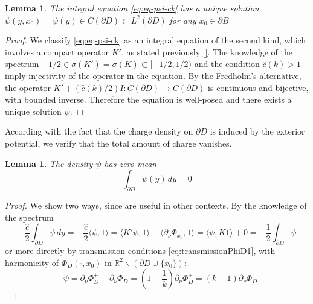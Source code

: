 \documentclass[10pt, a4paper, twoside, openright]{book}
\theoremstyle{definition}
\theoremstyle{plain}
\theoremstyle{plain}
\theoremstyle{plain}
\theoremstyle{plain}
\theoremstyle{plain}
\newtheorem{lemma}[subsection]{Lemma}
\theoremstyle{plain}
\theoremstyle{plain}
\theoremstyle{plain}
\begin{document}
\begin{lemma}
 The integral equation \ref{eq:eq-psi-ck} has a unique solution $\psi(y,x_0)=\psi(y) \in C(\partial D) \subset L^2(\partial D)$ for any $x_0 \in \partial B$
\end{lemma}
\begin{proof}
 We classify \ref{eq:eq-psi-ck} as an integral equation of the second kind, which involves a compact operator $K'$, as stated previously \ref{}. The knowledge of the spectrum $-1/2 \in \sigma(K')=\sigma(K) \subset [-1/2,1/2)$ and the condition $\hat{c}(k)>1$ imply injectivity of the operator in the equation.
 By the Fredholm's alternative, the operator $K'+(\hat{c}(k)/2)I:C(\partial D)\to C(\partial D)$ is continuous and bijective, with bounded inverse.
 Therefore the equation is well-posed and there exists a unique solution $\psi$.
\end{proof}
According with the fact that the charge density on $\partial D$ is induced by the exterior potential, we verify that the total amount of charge vanishes.
\begin{lemma}
 The density $\psi$ has zero mean
 \begin{equation}
  \int_{\partial D} \psi(y)\, dy = 0
 \end{equation}
\end{lemma}
\begin{proof}
We show two ways, since are useful in other contexts. By the knowledge of the spectrum
 \begin{equation*}
  -\frac{\hat{c}}{2} \int_{\partial D} \psi\,dy = -\frac{\hat{c}}{2} \langle \psi,1\rangle = \langle K'\psi,1\rangle + \langle \partial_\nu\Phi_{x_0},1\rangle = \langle \psi,K 1\rangle + 0 = -\frac{1}{2}\int_{\partial D} \psi
 \end{equation*}
 or more directly by transmission conditions \ref{eq:transmissionPhiD1}, with harmonicity of $\Phi_D(\cdot,x_0)$ in $\mathbb{R}^2\backslash(\partial D\cup\{x_0\})$:
 \begin{equation*}
  -\psi=\partial_\nu \Phi_D^+-\partial_\nu \Phi_D^-=(1-\frac{1}{k})\partial_\nu \Phi_D^+ = (k-1)\partial_\nu \Phi_D^-
 \end{equation*} 
\end{proof}
\end{document}
